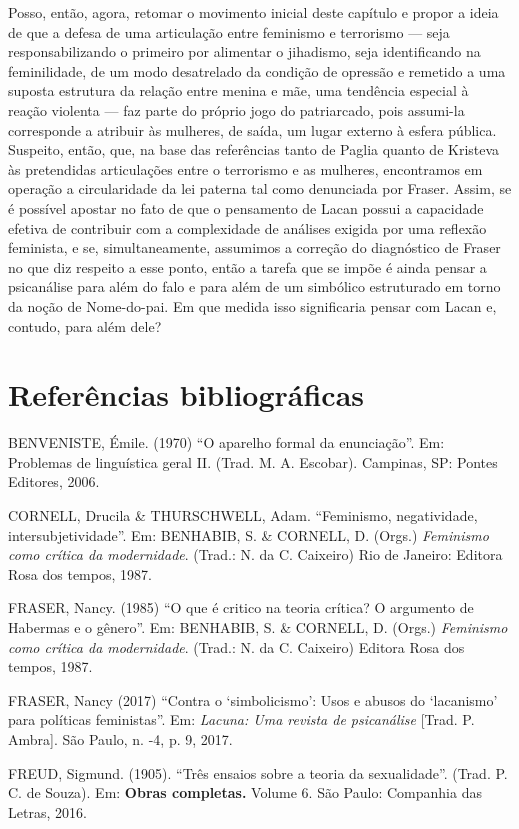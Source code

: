 Posso, então, agora, retomar o movimento inicial deste capítulo e propor
a ideia de que a defesa de uma articulação entre feminismo e terrorismo
--- seja responsabilizando o primeiro por alimentar o jihadismo, seja
identificando na feminilidade, de um modo desatrelado da condição de
opressão e remetido a uma suposta estrutura da relação entre menina e
mãe, uma tendência especial à reação violenta --- faz parte do próprio
jogo do patriarcado, pois assumi-la corresponde a atribuir às mulheres,
de saída, um lugar externo à esfera pública. Suspeito, então, que, na
base das referências tanto de Paglia quanto de Kristeva às pretendidas
articulações entre o terrorismo e as mulheres, encontramos em operação a
circularidade da lei paterna tal como denunciada por Fraser. Assim, se é
possível apostar no fato de que o pensamento de Lacan possui a
capacidade efetiva de contribuir com a complexidade de análises exigida
por uma reflexão feminista, e se, simultaneamente, assumimos a correção
do diagnóstico de Fraser no que diz respeito a esse ponto, então a
tarefa que se impõe é ainda pensar a psicanálise para além do falo e
para além de um simbólico estruturado em torno da noção de Nome-do-pai.
Em que medida isso significaria pensar com Lacan e, contudo, para além
dele?

\section{Referências bibliográficas}

BENVENISTE, Émile. (1970) ``O aparelho formal da enunciação''. Em:
Problemas de linguística geral II. (Trad. M. A. Escobar). Campinas, SP:
Pontes Editores, 2006.

CORNELL, Drucila \& THURSCHWELL, Adam. ``Feminismo, negatividade,
intersubjetividade''. Em: BENHABIB, S. \& CORNELL, D. (Orgs.)
\emph{Feminismo como crítica da modernidade}. (Trad.: N. da C. Caixeiro)
Rio de Janeiro: Editora Rosa dos tempos, 1987.

FRASER, Nancy. (1985) ``O que é critico na teoria crítica? O argumento
de Habermas e o gênero''. Em: BENHABIB, S. \& CORNELL, D. (Orgs.)
\emph{Feminismo como crítica da modernidade}. (Trad.: N. da C. Caixeiro)
Editora Rosa dos tempos, 1987.

FRASER, Nancy (2017) ``Contra o `simbolicismo': Usos e abusos do
`lacanismo' para políticas feministas''. Em: \emph{Lacuna: Uma revista
de psicanálise} {[}Trad. P. Ambra{]}. São Paulo, n. -4, p. 9, 2017.

FREUD, Sigmund. (1905). ``Três ensaios sobre a teoria da sexualidade''.
(Trad. P. C. de Souza). Em: \textbf{Obras completas.} Volume 6. São
Paulo: Companhia das Letras, 2016.

